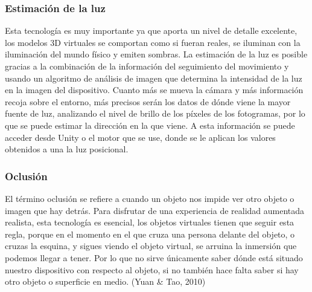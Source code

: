 \subsubsection{Estimación de la luz}
Esta tecnología es muy importante ya que aporta un nivel de detalle excelente, los modelos 3D virtuales se comportan como si fueran reales, se iluminan con la iluminación del mundo físico y emiten sombras. La estimación de la luz es posible gracias a la combinación de la información del seguimiento del movimiento y usando un algoritmo de análisis de imagen que determina la intensidad de la luz en la imagen del dispositivo. Cuanto más se mueva la cámara y más información recoja sobre el entorno, más precisos serán los datos de dónde viene la mayor fuente de luz, analizando el nivel de brillo de los píxeles de los fotogramas, por lo que se puede estimar la dirección en la que viene. A esta información se puede acceder desde Unity o el motor que se use, donde se le aplican los valores obtenidos a una la luz posicional.
\subsubsection{Oclusión}
El término oclusión se refiere a cuando un objeto nos impide ver otro objeto o imagen que hay detrás. Para disfrutar de una experiencia de realidad aumentada realista, esta tecnología es esencial, los objetos virtuales tienen que seguir esta regla, porque en el momento en el que cruza una persona delante del objeto, o cruzas la esquina, y sigues viendo el objeto virtual, se arruina la inmersión que podemos llegar a tener. Por lo que no sirve únicamente saber dónde está situado nuestro dispositivo con respecto al objeto, si no también hace falta saber si hay otro objeto o superficie en medio. (Yuan & Tao, 2010)

